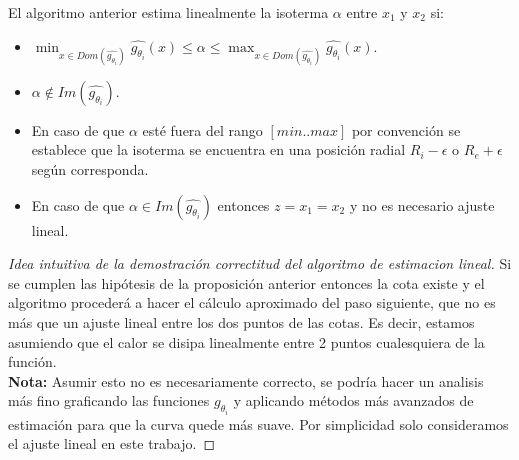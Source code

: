 \begin{proposition}
    El algoritmo anterior estima linealmente la isoterma $\alpha$ entre $x_1$ y $x_2$ si:
    \begin{itemize}
        \item $\displaystyle\min_{x \in Dom(\hat{g_{\theta_i}})}{\hat{g_{\theta_i}}(x)} \leq \alpha \leq \displaystyle\max_{x \in Dom(\hat{g_{\theta_i}})}{\hat{g_{\theta_i}}(x)}$.
        \item $\alpha \notin Im(\hat{g_{\theta_i}})$.
    \end{itemize}
    \begin{itemize}
        \item En caso de que $\alpha$ esté fuera del rango $[min..max]$ por convención se establece que la isoterma se encuentra en una posición radial $R_i - \epsilon$ o $R_e + \epsilon$ según corresponda.
        \item En caso de que $\alpha \in Im(\hat{g_{\theta_i}})$ entonces $z = x_1 = x_2$ y no es necesario ajuste lineal.
    \end{itemize}
\end{proposition}
\begin{proof}[Idea intuitiva de la demostraci\'on correctitud del algoritmo de estimacion lineal]
    Si se cumplen las hipótesis de la proposición anterior entonces la cota existe y el algoritmo procederá a hacer el cálculo aproximado del paso siguiente, que no es más que un ajuste lineal entre los dos puntos de las cotas. Es decir, estamos asumiendo que el calor se disipa linealmente entre 2 puntos cualesquiera de la función.\\
    \vspace{0.3cm}
    \textbf{Nota:} Asumir esto no es necesariamente correcto, se podría hacer un analisis más fino graficando las funciones $g_{\theta_i}$ y aplicando métodos más avanzados de estimación para que la curva quede más suave. Por simplicidad solo consideramos el ajuste lineal en este trabajo.
\end{proof}


